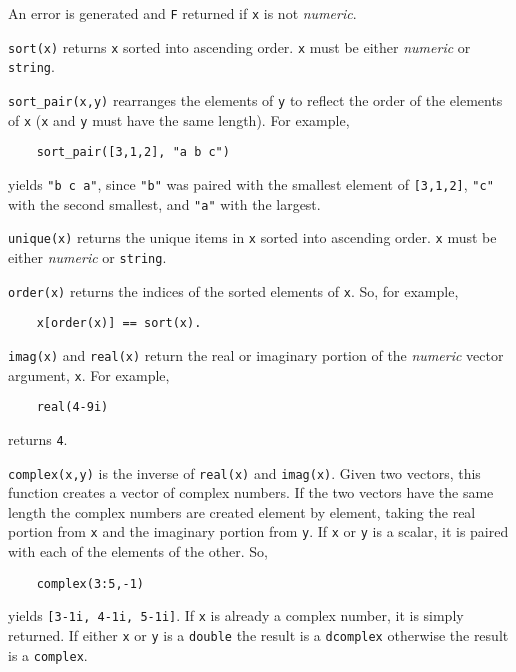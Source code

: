 \begin{sloppy}
\begin{list}{}{}
An error is generated and {\tt F} returned if {\tt x} is not {\em numeric\/}.

\item[{\tt sort(x)}] \label{sort-func}
returns {\tt x} sorted into ascending order.  {\tt x} must be either
{\em numeric} or {\tt string}.

\item[{\tt sort\_pair(x,y)}] \label{sort_pair-func}
rearranges the elements of {\tt y} to reflect the order
of the elements of {\tt x} ({\tt x} and {\tt y} must have the same length).
For example,
\begin{verbatim}
    sort_pair([3,1,2], "a b c")
\end{verbatim}
yields {\tt "b c a"}, since {\tt "b"}
was paired with the smallest element of {\tt [3,1,2]}, {\tt "c"} with the
second smallest, and {\tt "a"} with the largest.

\item[{\tt unique(x)}] \label{unique-func}
returns the unique items in {\tt x} sorted into ascending order.
{\tt x} must be either {\em numeric} or {\tt string}.

\item[{\tt order(x)}] \label{order-func}
returns the indices of the sorted elements of {\tt x}.  So, for example,
\begin{verbatim}
    x[order(x)] == sort(x).
\end{verbatim}

 
\item[{\tt imag(x)}] \label{imag-func} and {\tt real(x)} \label{real-func}
return the real or imaginary portion of the {\em numeric} vector argument,
{\tt x}. For example,
\begin{verbatim}
    real(4-9i)
\end{verbatim}
returns {\tt 4}.

\item[{\tt complex(x,y)}] \label{complex-func} 
is the inverse of {\tt real(x)} and {\tt imag(x)}. Given two vectors,
this function creates a vector of complex numbers. If the two
vectors have the same length the complex numbers are created 
element by element, taking the real portion from {\tt x} and
the imaginary portion from {\tt y}. If {\tt x} or {\tt y} is
a scalar, it is paired with each of the elements of the other.
So,
\begin{verbatim}
    complex(3:5,-1)
\end{verbatim}
yields {\tt [3-1i, 4-1i, 5-1i]}. If {\tt x} is already a complex
number, it is simply returned. If either {\tt x} or {\tt y} is
a {\tt double} the result is a {\tt dcomplex} otherwise the result
is a {\tt complex}.


\end{list}
\end{sloppy}
